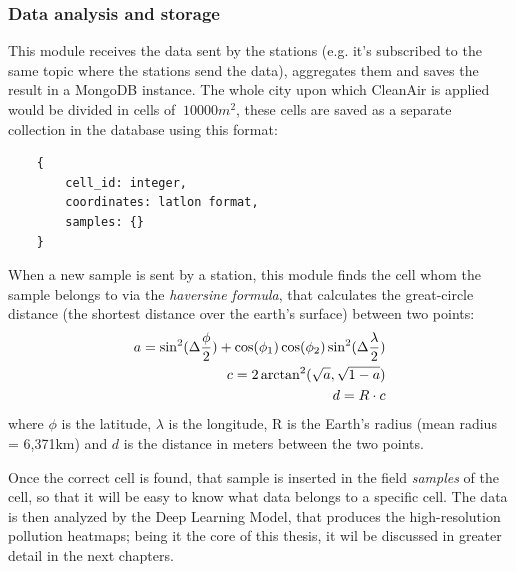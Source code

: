 \documentclass[11pt,a4paper,titlepage]{book}
\begin{document}
\subsubsection{Data analysis and storage}
This module receives the data sent by the stations (e.g. it's subscribed to the same topic where the stations send the data), aggregates them and saves the result in a MongoDB instance.
\newline
\newline
The whole city upon which CleanAir is applied would be divided in cells of $~10000m^2$, these cells are saved as a separate collection in the database using this format:
\begin{center}
\begin{verbatim}
    {
        cell_id: integer,
        coordinates: latlon format,
        samples: {}
    }
\end{verbatim}
\end{center}
When a new sample is sent by a station, this module finds the cell whom the sample belongs to via the \textit{haversine formula}, that calculates the great-circle distance (the shortest distance over the earth's surface) between two points:
\begin{align}
    \notag a = \sin^2(\Delta \frac{\phi}{2}) + \cos(\phi_1) \cos(\phi_2) \sin^2(\Delta \frac{\lambda}{2}) \\ 
    \notag c = 2 \arctan^2(\sqrt{a}, \sqrt{1-a}) \\
    d = R \cdot c
\end{align}
where $\phi$ is the latitude, $\lambda$ is the longitude, R is the Earth's radius (mean radius = 6,371km) and $d$ is the distance in meters between the two points.

Once the correct cell is found, that sample is inserted in the field \textit{samples} of the cell, so that it will be easy to know what data belongs to a specific cell.
\newline
\newline
The data is then analyzed by the Deep Learning Model, that produces the high-resolution pollution heatmaps; being it the core of this thesis, it wil be discussed in greater detail in the next chapters.
\end{document}
